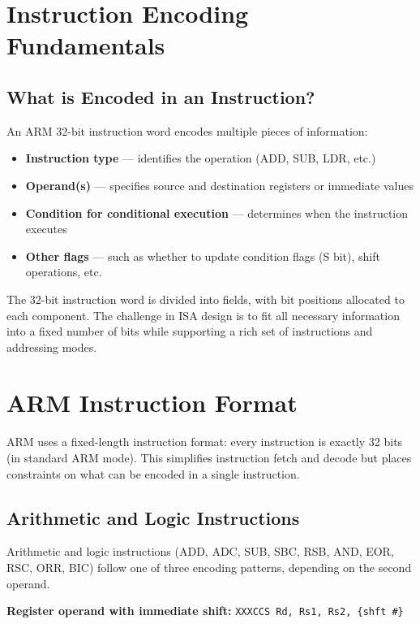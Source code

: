 \documentclass[11pt, a4paper, notitlepage]{report}
\theoremstyle{definition}
\theoremstyle{remark}
\theoremstyle{definition}
\begin{document}
\section{Instruction Encoding Fundamentals}

\subsection{What is Encoded in an Instruction?}

An ARM 32-bit instruction word encodes multiple pieces of information:

\begin{itemize}
  \item \textbf{Instruction type} --- identifies the operation (ADD, SUB, LDR, etc.)
  \item \textbf{Operand(s)} --- specifies source and destination registers or immediate values
  \item \textbf{Condition for conditional execution} --- determines when the instruction executes
  \item \textbf{Other flags} --- such as whether to update condition flags (S bit), shift operations, etc.
\end{itemize}

The 32-bit instruction word is divided into fields, with bit positions allocated to each component. The challenge in ISA design is to fit all necessary information into a fixed number of bits while supporting a rich set of instructions and addressing modes.

\section{ARM Instruction Format}

ARM uses a fixed-length instruction format: every instruction is exactly 32 bits (in standard ARM mode). This simplifies instruction fetch and decode but places constraints on what can be encoded in a single instruction.

\subsection{Arithmetic and Logic Instructions}

Arithmetic and logic instructions (ADD, ADC, SUB, SBC, RSB, AND, EOR, RSC, ORR, BIC) follow one of three encoding patterns, depending on the second operand.

\textbf{Register operand with immediate shift:} \texttt{XXXCCS Rd, Rs1, Rs2, \{shft \#\}}
\end{document}
